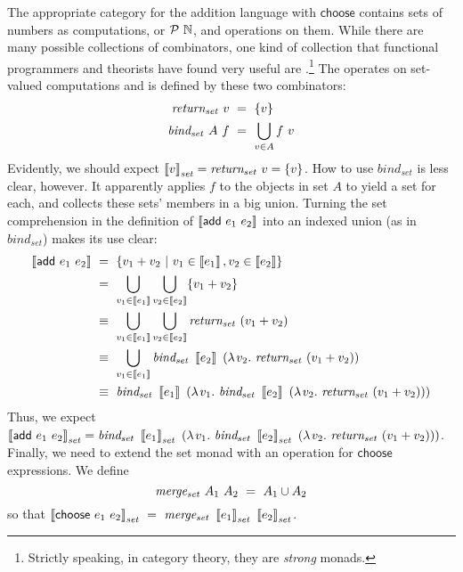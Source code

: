 {The appropriate category for the addition language with $\mathsf{choose}$ contains sets of numbers as computations, or $\mathcal{P}~\mathbb{N}$, and operations on them.
While there are many possible collections of combinators, one kind of collection that functional programmers and theorists have found very useful are .\footnote{Strictly speaking, in category theory, they are \emph{strong} monads.}
The  operates on set-valued computations and is defined by these two combinators:
\begin{equation}
\begin{aligned}
	\mathit{return_{set}}~v&\ =\ \{{v}\} \\
	\mathit{bind_{set}}~A~f&\ =\ \bigcup_{v \in A} f~v
\end{aligned}
\end{equation}
Evidently, we should expect $\left\llbracket{v}\right\rrbracket_\mathit{set} = \mathit{return_{set}}~v = \{{v}\}$.
How to use $\mathit{bind_{set}}$ is less clear, however.
It apparently applies $f$ to the objects in set $A$ to yield a set for each, and collects these sets' members in a big union.
Turning the set comprehension in the definition of $\left\llbracket{\mathsf{add}~e_1~e_2}\right\rrbracket$ into an indexed union (as in $\mathit{bind_{set}}$) makes its use clear:
\begin{equation}
\begin{aligned}
	\left\llbracket{\mathsf{add}~e_1~e_2}\right\rrbracket
	&\ =\ \lbrace {v_1 + v_2} \ \lvert\ {v_1 \in \left\llbracket{e_1}\right\rrbracket, v_2 \in \left\llbracket{e_2}\right\rrbracket} \rbrace
\\
	&\ =\ \bigcup_{v_1 \in \left\llbracket{e_1}\right\rrbracket} \bigcup_{v_2 \in \left\llbracket{e_2}\right\rrbracket} \{{v_1 + v_2}\}
\\
	&\ \equiv\ \bigcup_{v_1 \in \left\llbracket{e_1}\right\rrbracket} \bigcup_{v_2 \in \left\llbracket{e_2}\right\rrbracket} \mathit{return_{set}}~(v_1 + v_2)
\\
	&\ \equiv\ \bigcup_{v_1 \in \left\llbracket{e_1}\right\rrbracket} \mathit{bind_{set}}~\left\llbracket{e_2}\right\rrbracket~(\lambda\mspace{2mu}{v_2}\ldotp\, \mathit{return_{set}}~(v_1 + v_2))
\\
	&\ \equiv\ \mathit{bind_{set}}~\left\llbracket{e_1}\right\rrbracket~(\lambda\mspace{2mu}{v_1}\ldotp\, \mathit{bind_{set}}~\left\llbracket{e_2}\right\rrbracket~(\lambda\mspace{2mu}{v_2}\ldotp\, \mathit{return_{set}}~(v_1 + v_2)))
\end{aligned}
\end{equation}
Thus, we expect $\left\llbracket{\mathsf{add}~e_1~e_2}\right\rrbracket_\mathit{set} = \mathit{bind_{set}}~\left\llbracket{e_1}\right\rrbracket_\mathit{set}~(\lambda\mspace{2mu}{v_1}\ldotp\, \mathit{bind_{set}}~\left\llbracket{e_2}\right\rrbracket_\mathit{set}~(\lambda\mspace{2mu}{v_2}\ldotp\, \mathit{return_{set}}~(v_1 + v_2)))$.
Finally, we need to extend the set monad with an operation for $\mathsf{choose}$ expressions.
We define
\begin{equation}
	\mathit{merge_{set}}~A_1~A_2\ =\ A_1 \cup A_2
\end{equation}
so that $\meaningof{\mathsf{choose}~e_1~e_2}_\mathit{set}\ =\ \mathit{merge_{set}}~\meaningof{e_1}_\mathit{set}~\meaningof{e_2}_\mathit{set}$.

}
